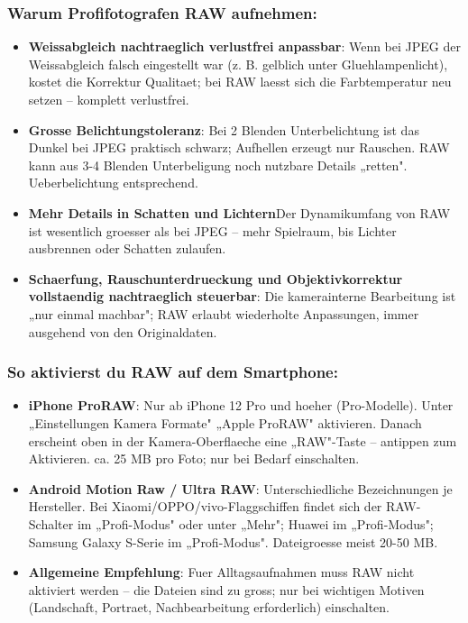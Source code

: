 \subsubsection*{Warum Profifotografen RAW aufnehmen:}

\begin{itemize}
  \item \textbf{Weissabgleich nachtraeglich verlustfrei anpassbar}: Wenn bei JPEG der Weissabgleich falsch eingestellt war (z. B. gelblich unter Gluehlampenlicht), kostet die Korrektur Qualitaet; bei RAW laesst sich die Farbtemperatur neu setzen – komplett verlustfrei.
  \item \textbf{Grosse Belichtungstoleranz}: Bei 2 Blenden Unterbelichtung ist das Dunkel bei JPEG praktisch schwarz; Aufhellen erzeugt nur Rauschen. RAW kann aus 3-4 Blenden Unterbeligung noch nutzbare Details „retten". Ueberbelichtung entsprechend.
  \item \textbf{Mehr Details in Schatten und Lichtern}Der Dynamikumfang von RAW ist wesentlich groesser als bei JPEG – mehr Spielraum, bis Lichter ausbrennen oder Schatten zulaufen.
  \item \textbf{Schaerfung, Rauschunterdrueckung und Objektivkorrektur vollstaendig nachtraeglich steuerbar}: Die kamerainterne Bearbeitung ist „nur einmal machbar"; RAW erlaubt wiederholte Anpassungen, immer ausgehend von den Originaldaten.
\end{itemize}

\subsubsection*{So aktivierst du RAW auf dem Smartphone:}

\begin{itemize}
  \item \textbf{iPhone ProRAW}: Nur ab iPhone 12 Pro und hoeher (Pro-Modelle). Unter „Einstellungen Kamera Formate" „Apple ProRAW" aktivieren. Danach erscheint oben in der Kamera-Oberflaeche eine „RAW"-Taste – antippen zum Aktivieren. ca. 25 MB pro Foto; nur bei Bedarf einschalten.
  \item \textbf{Android Motion Raw / Ultra RAW}: Unterschiedliche Bezeichnungen je Hersteller. Bei Xiaomi/OPPO/vivo-Flaggschiffen findet sich der RAW-Schalter im „Profi-Modus" oder unter „Mehr"; Huawei im „Profi-Modus"; Samsung Galaxy S-Serie im „Profi-Modus". Dateigroesse meist 20-50 MB.
  \item \textbf{Allgemeine Empfehlung}: Fuer Alltagsaufnahmen muss RAW nicht aktiviert werden – die Dateien sind zu gross; nur bei wichtigen Motiven (Landschaft, Portraet, Nachbearbeitung erforderlich) einschalten.
\end{itemize}

